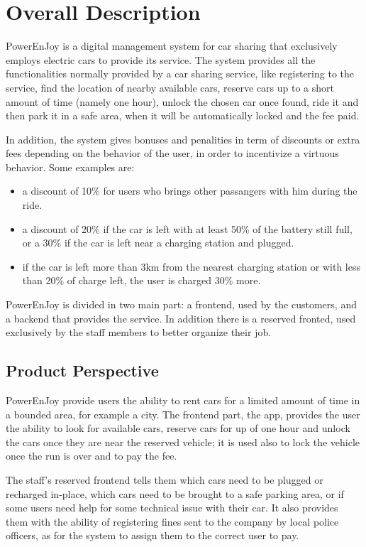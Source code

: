\documentclass[11pt]{article} %
\newcommand{\pe}{PowerEnJoy }
\begin{document}
\section{Overall Description}

\pe is a digital management system for car sharing that exclusively employs electric cars to provide its service. The system provides all the functionalities normally provided by a car sharing service, like registering to the service, find the location of nearby available cars, reserve cars up to a short amount of time (namely one hour), unlock the chosen car once found, ride it and then park it in a safe area, when it will be automatically locked and the fee paid.

In addition, the system gives bonuses and penalities in term of discounts or extra fees depending on the behavior of the user, in order to incentivize a virtuous behavior. Some examples are:

\begin{itemize}
	\item a discount of 10\% for users who brings other passangers with him during the ride.
	\item a discount of 20\% if the car is left with at least 50\% of the battery still full, or a 30\% if the car is left near a charging station and plugged.
	\item if the car is left more than 3km from the nearest charging station or with less than 20\% of charge left, the user is charged 30\% more.
\end{itemize}

\pe is divided in two main part: a frontend, used by the customers, and a backend that provides the service. In addition there is a reserved fronted, used exclusively by the staff members to better organize their job.


\subsection{Product Perspective}
  
  \pe provide users the ability to rent cars for a limited amount of time in a bounded area, for example a city. 
  The frontend part, the app, provides the user the ability to look for available cars, reserve cars for up of one hour and unlock the cars once they are near the reserved vehicle; it is used also to lock the vehicle once the run is over and to pay the fee.

The staff's reserved frontend tells them which cars need to be plugged or recharged in-place, which cars need to be brought to a safe parking area, or if some users need help for some technical issue with their car. It also provides them with the ability of registering fines sent to the company by local police officers, as for the system to assign them to the correct user to pay.
\end{document}
